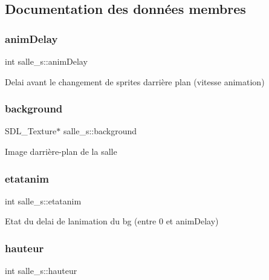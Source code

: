 \subsection{Documentation des données membres}
\mbox{\label{structsalle__s_a3a3512a26fd8960cda702e9225937193}} 
\subsubsection{\texorpdfstring{anim\+Delay}{animDelay}}
{\footnotesize\ttfamily int salle\+\_\+s\+::anim\+Delay}

Delai avant le changement de sprites d\textquotesingle{}arrière plan (vitesse animation) \mbox{\label{structsalle__s_a5ef73bdeb5f07b6c8b4978dcf265d0d2}} 
\subsubsection{\texorpdfstring{background}{background}}
{\footnotesize\ttfamily S\+D\+L\+\_\+\+Texture$\ast$ salle\+\_\+s\+::background}

Image d\textquotesingle{}arrière-\/plan de la salle \mbox{\label{structsalle__s_a6ac170caff770f795abb7b6a79e84cc7}} 
\subsubsection{\texorpdfstring{etatanim}{etatanim}}
{\footnotesize\ttfamily int salle\+\_\+s\+::etatanim}

Etat du delai de l\textquotesingle{}animation du bg (entre 0 et anim\+Delay) \mbox{\label{structsalle__s_a2be13fedfc5f31bc7f02c65af7d95c7a}} 
\subsubsection{\texorpdfstring{hauteur}{hauteur}}
{\footnotesize\ttfamily int salle\+\_\+s\+::hauteur}

